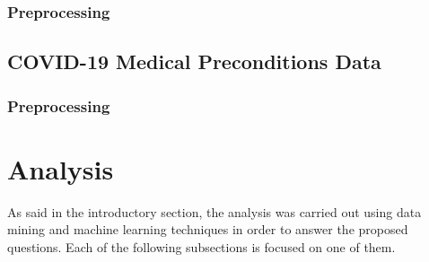 \documentclass[11pt,a4paper]{article}
\begin{document}
\subsubsection{Preprocessing}
\subsection{COVID-19 Medical Preconditions Data}
\subsubsection{Preprocessing}

\section{Analysis}
As said in the introductory section, the analysis was carried out using data
mining and machine learning techniques in order to answer the proposed
questions. Each of the following subsections is focused on one of them.
\end{document}
